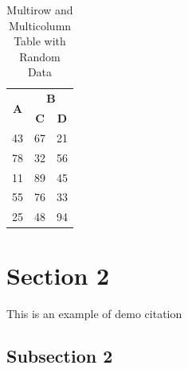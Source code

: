 \begin{table}[htbp]
    \centering
    \begin{tabular}{|c|c|c|}
        \hline
        \multirow{2}{*}{\textbf{A}} & \multicolumn{2}{c|}{\textbf{B}} \\ \cline{2-3} 
                                    & \textbf{C}       & \textbf{D}       \\ \hline
        43 & 67 & 21 \\ \hline
        78 & 32 & 56 \\ \hline
        11 & 89 & 45 \\ \hline
        55 & 76 & 33 \\ \hline
        25 & 48 & 94 \\ \hline
    \end{tabular}
    \caption{Multirow and Multicolumn Table with Random Data}
    \label{tab:demo_table}
\end{table}


    

\section{Section 2}
This is an example of demo citation \cite{Willighagen_2019_Citation}
    \subsection{Subsection 2}

